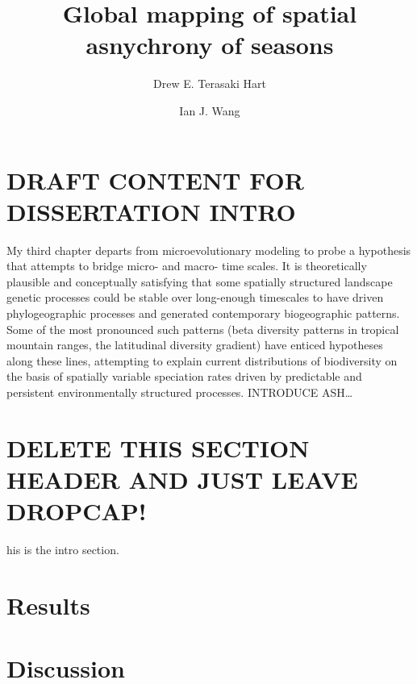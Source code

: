 \documentclass[9pt,twocolumn,twoside,lineno]{pnas-new}
\title{Global mapping of spatial asnychrony of seasons}
\author[a,1]{Drew E. Terasaki Hart}
\author[a]{Ian J. Wang}
\affil[a]{Department of Environmental Science, Policy, and Management, University of California, Berkeley, CA 94720}
\begin{document}
\maketitle
\thispagestyle{firststyle}

\section*{DRAFT CONTENT FOR DISSERTATION INTRO}
My third chapter departs from microevolutionary modeling to probe a
hypothesis that attempts to bridge micro- and macro- time scales. It is
theoretically plausible and conceptually satisfying that some spatially
structured landscape genetic processes could be stable over long-enough
timescales to have driven phylogeographic processes and generated
contemporary biogeographic patterns. Some of the most pronounced such
patterns (beta diversity patterns in tropical mountain ranges, the
latitudinal diversity gradient) have enticed hypotheses along these lines,
attempting to explain current distributions of biodiversity on the basis
of spatially variable speciation rates driven by predictable and
persistent environmentally structured processes. INTRODUCE ASH…

\section{DELETE THIS SECTION HEADER AND JUST LEAVE DROPCAP!}
his is the intro section.


\section*{Results}


\section*{Discussion}
\end{document}
